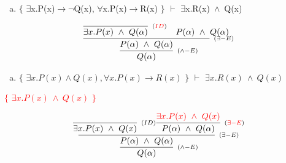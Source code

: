 \documentclass[aspectratio=43]{beamer}
\newcommand{\ria}{$\rightarrow$}
\newcommand{\fall}{$\forall$}
\newcommand{\ex}{$\exists$}
\newcommand{\nao}{$\neg$}
\newcommand{\andd}{$\wedge$}
\begin{document}
    \begin{frame}[fragile]
    
    	\begin{enumerate}[d)]
			\item $\{$ \ex x.P(x)\ria \nao Q(x), \fall x.P(x)\ria R(x) $\}$ $\vdash$ \ex x.R(x)\ \andd\ Q(x) \\
		\end{enumerate}
        
        \vspace{80pt}
        
        \[
        \begin{array}{c}
		
        	\infer[_{(\land -E)}] 
                	{Q(\alpha)}
                    {\infer[_{(\exists -E)}]
                    	{P(\alpha)\ \land \ Q(\alpha)}
                    	{\infer[_{(\textcolor{red}{ID})}]
                        	{\exists x.P(x)\ \land \ Q(\alpha)}
                            {}
                        \hspace{10pt}
                        P(\alpha)\ \land \ Q(\alpha)
                        }
                    }
		\end{array}
        \]
        
	\end{frame}
    
     \begin{frame}[fragile]
    
    	\begin{enumerate}[d)]
			\item $\{$ $\exists x.P(x)\land Q(x), \forall x.P(x)\to R(x)$ $\}$ $\vdash$ $\exists x.R(x)\ \land\ Q(x) $\\
		\end{enumerate}
        \textcolor{red}{$\{$ $\exists x.P(x)\ \land \ Q(x)$ $\}$}
        \vspace{80pt}
        
        \[
        \begin{array}{c}
		
        	\infer[_{(\land -E)}] 
                	{Q(\alpha)}
                    {\infer[_{(\exists -E)}]
                    	{P(\alpha)\ \land \ Q(\alpha)}
                    	{\infer[_{(ID)}]
                        	{\exists x.P(x)\ \land \ Q(x)}
                            {}
                        \infer[_{(\textcolor{red}{\exists -E})}] 
                        	{P(\alpha)\ \land \ Q(\alpha)}
                            {\textcolor{red}{\exists x.P(x)\ \land \ Q(x)}}
                        }
                    }
		\end{array}
        \]
        
	\end{frame}
        
\end{document}
